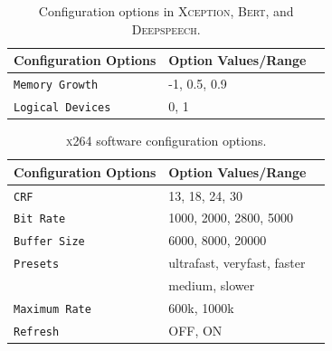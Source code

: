 \begin{table}[]
\centering
\caption{Configuration options in \textsc{Xception}, \textsc{Bert}, and \textsc{Deepspeech}.}
\begin{tabular}{lll}
\hline
Configuration Options & Option Values/Range  \\
\hline 
\texttt{Memory Growth}                      &    -1, 0.5, 0.9            \\ 
\texttt{Logical Devices}                      &  0, 1               \\ 
\hline
\end{tabular}
\label{tab:ml_conf}
\end{table}


\begin{table}[]
\centering
\caption{\textsc{x264} software configuration options.}
\begin{tabular}{lll}
\hline
Configuration Options & Option Values/Range  \\
\hline 
\texttt{CRF} &  13, 18, 24, 30               \\  
\texttt{Bit Rate} & 1000, 2000, 2800, 5000         \\  
\texttt{Buffer Size} &  6000, 8000, 20000          \\  
\texttt{Presets} &   ultrafast, veryfast, faster\\
& medium, slower  \\  
\texttt{Maximum Rate} &       600k, 1000k         \\  
\texttt{Refresh} &       OFF, ON         \\  
\hline
\end{tabular}
\label{tab:x264_conf}
\end{table}


\begin{table}[]
\centering
\caption{\textsc{SQLite} software configuration options.}
\label{tab:sqlite_conf}
\end{table}


